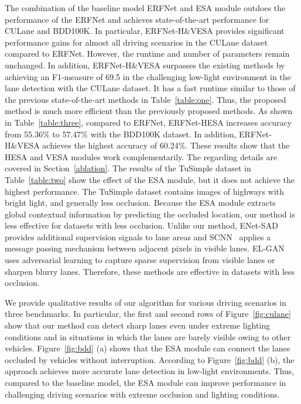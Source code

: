 \documentclass[10pt,twocolumn,letterpaper]{article}
\begin{document}
The combination of the baseline model ERFNet and ESA module outdoes the performance of the ERFNet and achieves state-of-the-art performance for CULane and BDD100K. In particular, ERFNet-H\&VESA provides significant performance gains for almost all driving scenarios in the CULane dataset compared to ERFNet. However, the runtime and number of parameters remain unchanged. In addition, ERFNet-H\&VESA surpasses the existing methods by achieving an F1-measure of 69.5 in the challenging low-light environment in the lane detection with the CULane dataset. It has a fast runtime similar to those of the previous state-of-the-art methods in Table~\ref{table:one}. Thus, the proposed method is much more efficient than the previously proposed methods. As shown in Table~\ref{table:three}, compared to ERFNet, ERFNet-HESA increases accuracy from 55.36\% to 57.47\% with the BDD100K dataset. In addition, ERFNet-H\&VESA achieves the highest accuracy of 60.24\%. These results show that the HESA and VESA modules work complementarily. The regarding details are covered in Section~\ref{ablation}. The results of the TuSimple dataset in Table~\ref{table:two} show the effect of the ESA module, but it does not achieve the highest performance. The TuSimple dataset contains images of highways with bright light, and generally less occlusion. Because the ESA module extracts global contextual information by predicting the occluded location, our method is less effective for datasets with less occlusion. Unlike our method, ENet-SAD~\cite{hou2019learning} provides additional supervision signals to lane areas and SCNN~\cite{pan2017spatial} applies a message passing mechanism between adjacent pixels in visible lanes. EL-GAN~\cite{ghafoorian2018gan} uses adversarial learning to capture sparse supervision from visible lanes or sharpen blurry lanes. Therefore, these methods are effective in datasets with less occlusion. 

We provide qualitative results of our algorithm for various driving scenarios in three benchmarks. In particular, the first and second rows of Figure~\ref{fig:culane} show that our method can detect sharp lanes even under extreme lighting conditions and in situations in which the lanes are barely visible owing to other vehicles. Figure~\ref{fig:bdd} (a) shows that the ESA module can connect the lanes occluded by vehicles without interruption. According to Figure~\ref{fig:bdd} (b), the approach achieves more accurate lane detection in low-light environments. Thus, compared to the baseline model, the ESA module can improve performance in challenging driving scenarios with extreme occlusion and lighting conditions.
\end{document}

